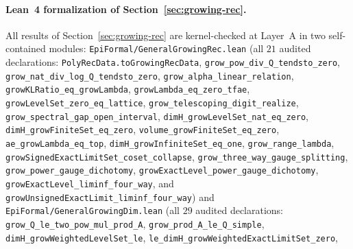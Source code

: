 \documentclass[11pt]{article}
\theoremstyle{definition}
\theoremstyle{remark}
\begin{document}
\paragraph{Lean~4 formalization of Section~\ref{sec:growing-rec}.}
All results of Section~\ref{sec:growing-rec} are kernel-checked at Layer~A in two
self-contained modules:
\texttt{EpiFormal/\allowbreak General\allowbreak Growing\allowbreak Rec.lean}
(all $21$ audited declarations: \texttt{PolyRecData.\allowbreak toGrowingRecData},
\texttt{grow\_\allowbreak pow\_\allowbreak div\_\allowbreak Q\_\allowbreak tendsto\_\allowbreak zero},
\texttt{grow\_\allowbreak nat\_\allowbreak div\_\allowbreak log\_\allowbreak Q\_\allowbreak tendsto\_\allowbreak zero},
\texttt{grow\_\allowbreak alpha\_\allowbreak linear\_\allowbreak relation},
\texttt{growKLRatio\_\allowbreak eq\_\allowbreak growLambda},
\texttt{growLambda\_\allowbreak eq\_\allowbreak zero\_\allowbreak tfae},
\texttt{growLevelSet\_\allowbreak zero\_\allowbreak eq\_\allowbreak lattice},
\texttt{grow\_\allowbreak telescoping\_\allowbreak digit\_\allowbreak realize},
\texttt{grow\_\allowbreak spectral\_\allowbreak gap\_\allowbreak open\_\allowbreak interval},
\texttt{dimH\_\allowbreak growLevelSet\_\allowbreak nat\_\allowbreak eq\_\allowbreak zero},
\texttt{dimH\_\allowbreak growFiniteSet\_\allowbreak eq\_\allowbreak zero},
\texttt{volume\_\allowbreak growFiniteSet\_\allowbreak eq\_\allowbreak zero},
\texttt{ae\_\allowbreak growLambda\_\allowbreak eq\_\allowbreak top},
\texttt{dimH\_\allowbreak growInfiniteSet\_\allowbreak eq\_\allowbreak one},
\texttt{grow\_\allowbreak range\_\allowbreak lambda},
\texttt{growSignedExactLimitSet\_\allowbreak coset\_\allowbreak collapse},
\texttt{grow\_\allowbreak three\_\allowbreak way\_\allowbreak gauge\_\allowbreak splitting},
\texttt{grow\_\allowbreak power\_\allowbreak gauge\_\allowbreak dichotomy},
\texttt{growExactLevel\_\allowbreak power\_\allowbreak gauge\_\allowbreak dichotomy},
\texttt{growExactLevel\_\allowbreak liminf\_\allowbreak four\_\allowbreak way}, and
\texttt{growUnsignedExactLimit\_\allowbreak liminf\_\allowbreak four\_\allowbreak way}) and
\texttt{EpiFormal/\allowbreak General\allowbreak Growing\allowbreak Dim.lean}
(all $29$ audited declarations:
\texttt{grow\_\allowbreak Q\_\allowbreak le\_\allowbreak two\_\allowbreak pow\_\allowbreak mul\_\allowbreak prod\_\allowbreak A},
\texttt{grow\_\allowbreak prod\_\allowbreak A\_\allowbreak le\_\allowbreak Q\_\allowbreak simple},
\texttt{dimH\_\allowbreak grow\allowbreak Weighted\allowbreak LevelSet\_\allowbreak le},
\texttt{le\_\allowbreak dimH\_\allowbreak grow\allowbreak Weighted\allowbreak ExactLimitSet\_\allowbreak zero},
\end{document}
